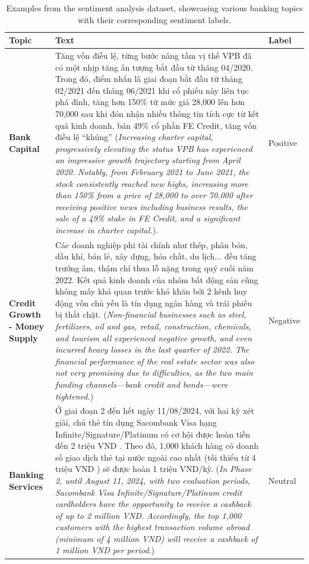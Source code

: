 {\begin{table}[h!]
  \begin{center}
  \begin{tabularx}{\textwidth}{|p{4cm}|X|l|}
  \hline
  \textbf{Topic} & \textbf{Text} & \textbf{Label} \\
  \hline
  \textbf{Bank Capital} & Tăng vốn điều lệ, từng bước nâng tầm vị thế
  VPB đã có một nhịp tăng ấn tượng bắt đầu từ tháng 04/2020. Trong đó, điểm nhấn là giai đoạn bắt đầu từ tháng 02/2021 đến tháng 06/2021 khi cổ phiếu này liên tục phá đỉnh, tăng hơn 150\% từ mức giá 28,000 lên hơn 70,000 sau khi đón nhận nhiều thông tin tích cực từ kết quả kinh doanh, bán 49\% cổ phần FE Credit, tăng vốn điều lệ “khủng”
  (\textit{Increasing charter capital, progressively elevating the status
  VPB has experienced an impressive growth trajectory starting from April 2020. Notably, from February 2021 to June 2021, the stock consistently reached new highs, increasing more than 150\% from a price of 28,000 to over 70,000 after receiving positive news including business results, the sale of a 49\% stake in FE Credit, and a significant increase in charter capital.}). & Positive \\
  \hline
  \textbf{Credit Growth - Money Supply} & Các doanh nghiệp phi tài chính như thép, phân bón, dầu khí, bán lẻ, xây dựng, hóa chất, du lịch... đều tăng trưởng âm, thậm chí thua lỗ nặng trong quý cuối năm 2022. Kết quả kinh doanh của nhóm bất động sản cũng không mấy khả quan trước khó khăn bởi 2 kênh huy động vốn chủ yếu là tín dụng ngân hàng và trái phiếu bị thắt chặt. 
  (\textit{Non-financial businesses such as steel, fertilizers, oil and gas, retail, construction, chemicals, and tourism all experienced negative growth, and even incurred heavy losses in the last quarter of 2022. The financial performance of the real estate sector was also not very promising due to difficulties, as the two main funding channels—bank credit and bonds—were tightened.}) & Negative \\
  \hline
  \textbf{Banking Services} & Ở giai đoạn 2 đến hết ngày 11/08/2024, với hai kỳ xét giải, chủ thẻ tín dụng Sacombank Visa hạng Infinite/Signature/Platinum có cơ hội được hoàn tiền đến 2 triệu VND . Theo đó, 1,000 khách hàng có doanh số giao dịch thẻ tại nước ngoài cao nhất (tối thiểu từ 4 triệu VND ) sẽ được hoàn 1 triệu VND/kỳ. 
  (\textit{In Phase 2, until August 11, 2024, with two evaluation periods, Sacombank Visa Infinite/Signature/Platinum credit cardholders have the opportunity to receive a cashback of up to 2 million VND. Accordingly, the top 1,000 customers with the highest transaction volume abroad (minimum of 4 million VND) will receive a cashback of 1 million VND per period.})& Neutral \\
  \hline
  \end{tabularx}
\end{center}
  \caption{Examples from the sentiment analysis dataset, showcasing various banking topics with their corresponding sentiment labels.}
  \label{tab:dataset_examples}
\end{table}

}
